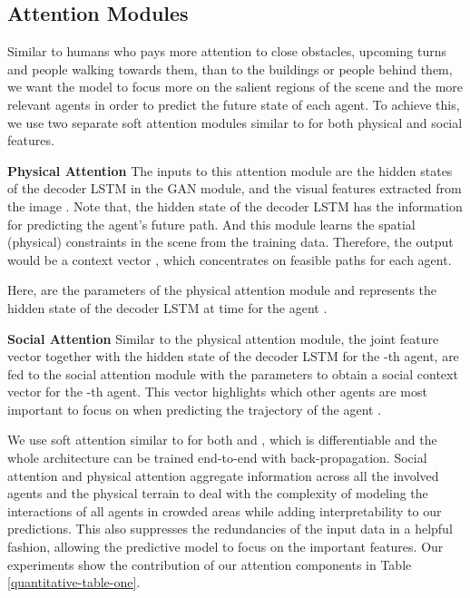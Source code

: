 \documentclass[10pt,twocolumn,letterpaper]{article}
\begin{document}
\subsection{Attention Modules}
\label{sec:Attention_Modules}
Similar to humans who pays more attention to close obstacles, upcoming turns and people walking towards them, than to the buildings or people behind them, we want the model to focus more on the salient regions of the scene and the more relevant agents in order to predict the future state of each agent. To achieve this, we use two separate soft attention modules similar to \cite{xu2015show} for both physical  and social  features.
	
\textbf{Physical Attention} The inputs to this attention module  are the hidden states of the decoder LSTM in the GAN module, and the visual features extracted from the image . Note that, the hidden state of the decoder LSTM has the information for predicting the agent's future path. And this module learns the spatial (physical) constraints in the scene from the training data. Therefore, the output would be a context vector , which concentrates on feasible paths for each agent. 

Here,  are the parameters of the physical attention module and  represents the hidden state of the decoder LSTM at time  for the agent .



\textbf{Social Attention} Similar to the physical attention module, the joint feature vector  together with the hidden state of the decoder LSTM for the -th agent, are fed to the social attention module  with the parameters  to obtain a social context vector  for the -th agent. This vector highlights which other agents are most important to focus on when predicting the trajectory of the agent .


We use soft attention similar to \cite{xu2015show} for both  and , which is differentiable and the whole architecture can be trained end-to-end with back-propagation. Social attention and physical attention aggregate information across all the involved agents and the physical terrain to deal with the complexity of modeling the interactions of all agents in crowded areas while adding interpretability to our predictions. This also suppresses the redundancies of the input data in a helpful fashion, allowing the predictive model to focus on the important features. Our experiments show the contribution of our attention components in Table \ref{quantitative-table-one}.
 
\end{document}
